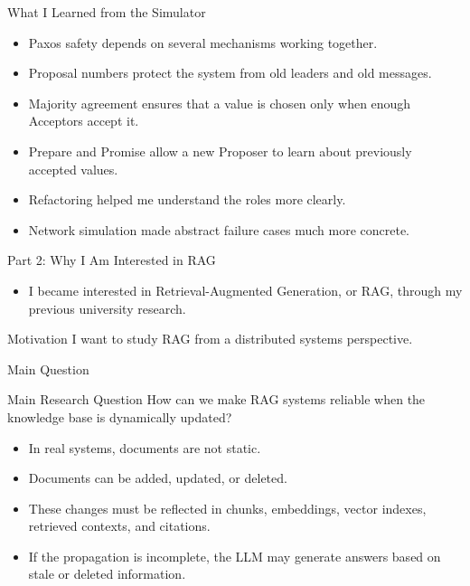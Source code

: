 \documentclass[aspectratio=169]{beamer}
\begin{document}
\begin{frame}{What I Learned from the Simulator}
  \begin{itemize}
    \item Paxos safety depends on several mechanisms working together.
    \item Proposal numbers protect the system from old leaders and old messages.
    \item Majority agreement ensures that a value is chosen only when enough Acceptors accept it.
    \item Prepare and Promise allow a new Proposer to learn about previously accepted values.
    \item Refactoring helped me understand the roles more clearly.
    \item Network simulation made abstract failure cases much more concrete.
  \end{itemize}
\end{frame}

\begin{frame}{Part 2: Why I Am Interested in RAG}
  \begin{itemize}
    \item I became interested in Retrieval-Augmented Generation, or RAG, through my previous university research.
  \end{itemize}

  \begin{block}{Motivation}
    I want to study RAG from a distributed systems perspective.
  \end{block}
\end{frame}

\begin{frame}{Main Question}
  \begin{block}{Main Research Question}
    How can we make RAG systems reliable when the knowledge base is dynamically updated?
  \end{block}

  \begin{itemize}
    \item In real systems, documents are not static.
    \item Documents can be added, updated, or deleted.
    \item These changes must be reflected in chunks, embeddings, vector indexes, retrieved contexts, and citations.
    \item If the propagation is incomplete, the LLM may generate answers based on stale or deleted information.
  \end{itemize}
\end{frame}
\end{document}

